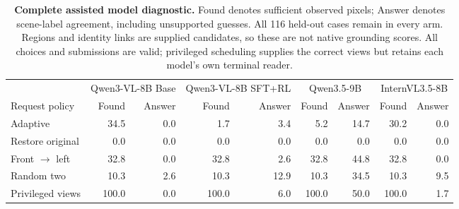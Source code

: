 \begin{table}[t]\centering\small
\caption{\textbf{Complete assisted model diagnostic.}
Found denotes sufficient observed pixels; Answer denotes scene-label agreement, including unsupported guesses.
All 116 held-out cases remain in every arm.
Regions and identity links are supplied candidates, so these are not native grounding scores.
All choices and submissions are valid; privileged scheduling supplies the correct views but retains each model's own terminal reader.}
\label{tab:multistep-models}
\begin{tabular}{@{}lrrrrrrrr@{}}\toprule
& \multicolumn{2}{c}{Qwen3-VL-8B Base} & \multicolumn{2}{c}{Qwen3-VL-8B SFT+RL} & \multicolumn{2}{c}{Qwen3.5-9B} & \multicolumn{2}{c}{InternVL3.5-8B}\\
\cmidrule(lr){2-3}\cmidrule(lr){4-5}\cmidrule(lr){6-7}\cmidrule(lr){8-9}
Request policy & Found & Answer & Found & Answer & Found & Answer & Found & Answer\\\midrule
Adaptive & 34.5 & 0.0 & 1.7 & 3.4 & 5.2 & 14.7 & 30.2 & 0.0\\
Restore original & 0.0 & 0.0 & 0.0 & 0.0 & 0.0 & 0.0 & 0.0 & 0.0\\
Front $\rightarrow$ left & 32.8 & 0.0 & 32.8 & 2.6 & 32.8 & 44.8 & 32.8 & 0.0\\
Random two & 10.3 & 2.6 & 10.3 & 12.9 & 10.3 & 34.5 & 10.3 & 9.5\\
Privileged views & 100.0 & 0.0 & 100.0 & 6.0 & 100.0 & 50.0 & 100.0 & 1.7\\
\bottomrule\end{tabular}
\end{table}
